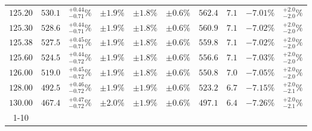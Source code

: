 \begin{table}[ht!]
{{\begin{tabular}{| cc | c | ccc | ccc | c |}
$125.20$ & $530.1$ & $^{+0.44}_{-0.71}\%$ & $\pm 1.9\%$ & {\color{black!55}$\pm 1.8\%$} & {\color{black!55}$\pm 0.6\%$} & $562.4$ & $7.1$ & $-7.01\%$ & $^{+2.0}_{-2.0}\%$ \\
$125.30$ & $528.6$ & $^{+0.44}_{-0.71}\%$ & $\pm 1.9\%$ & {\color{black!55}$\pm 1.8\%$} & {\color{black!55}$\pm 0.6\%$} & $560.9$ & $7.1$ & $-7.02\%$ & $^{+2.0}_{-2.0}\%$ \\
$125.38$ & $527.5$ & $^{+0.45}_{-0.71}\%$ & $\pm 1.9\%$ & {\color{black!55}$\pm 1.8\%$} & {\color{black!55}$\pm 0.6\%$} & $559.8$ & $7.1$ & $-7.02\%$ & $^{+2.0}_{-2.0}\%$ \\
$125.60$ & $524.5$ & $^{+0.44}_{-0.72}\%$ & $\pm 1.9\%$ & {\color{black!55}$\pm 1.8\%$} & {\color{black!55}$\pm 0.6\%$} & $556.6$ & $7.1$ & $-7.03\%$ & $^{+2.0}_{-2.0}\%$ \\
$126.00$ & $519.0$ & $^{+0.45}_{-0.72}\%$ & $\pm 1.9\%$ & {\color{black!55}$\pm 1.8\%$} & {\color{black!55}$\pm 0.6\%$} & $550.8$ & $7.0$ & $-7.05\%$ & $^{+2.0}_{-2.0}\%$ \\
$128.00$ & $492.5$ & $^{+0.46}_{-0.72}\%$ & $\pm 1.9\%$ & {\color{black!55}$\pm 1.9\%$} & {\color{black!55}$\pm 0.6\%$} & $523.2$ & $6.7$ & $-7.15\%$ & $^{+2.0}_{-2.1}\%$ \\
$130.00$ & $467.4$ & $^{+0.47}_{-0.72}\%$ & $\pm 2.0\%$ & {\color{black!55}$\pm 1.9\%$} & {\color{black!55}$\pm 0.6\%$} & $497.1$ & $6.4$ & $-7.26\%$ & $^{+2.0}_{-2.1}\%$ \\
\cline{1-10}
\end{tabular}
}
}
\end{table}

